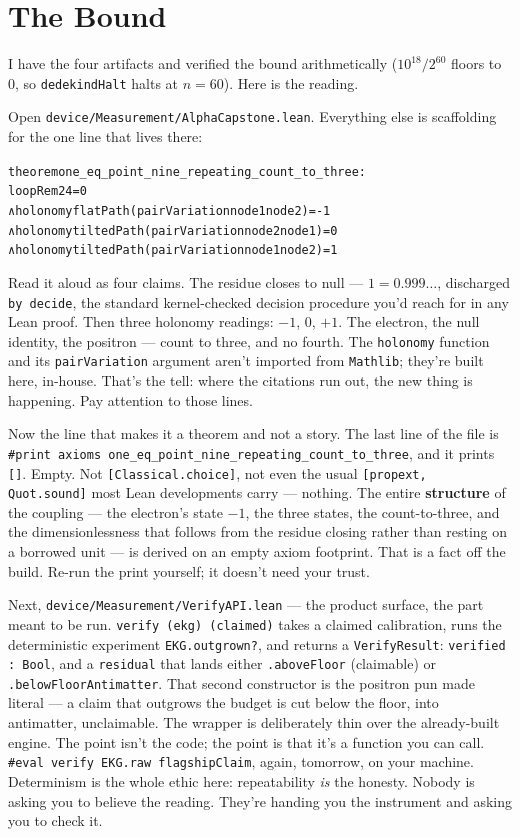 \chapter{The Bound}

I have the four artifacts and verified the bound arithmetically (\(10^{18}/2^{60}\) floors to \(0\), so
\texttt{dedekindHalt} halts at \(n = 60\)). Here is the reading.

Open \texttt{device/Measurement/AlphaCapstone.lean}. Everything else is scaffolding for the one line that lives
there:

\begin{alltt}
theorem one_eq_point_nine_repeating_count_to_three :
    loopRem 2 4 = 0
    ∧ holonomy flatPath   (pairVariation node1 node2) = -1
    ∧ holonomy tiltedPath (pairVariation node2 node1) =  0
    ∧ holonomy tiltedPath (pairVariation node1 node2) =  1
\end{alltt}

Read it aloud as four claims. The residue closes to null --- \(1 = 0.999\ldots\), discharged \texttt{by decide},
the standard kernel-checked decision procedure you'd reach for in any Lean proof. Then three holonomy readings:
\(-1\), \(0\), \(+1\). The electron, the null identity, the positron --- count to three, and no fourth. The
\texttt{holonomy} function and its \texttt{pairVariation} argument aren't imported from \texttt{Mathlib}; they're
built here, in-house. That's the tell: where the citations run out, the new thing is happening. Pay attention to
those lines.

Now the line that makes it a theorem and not a story. The last line of the file is
\texttt{\#print axioms one\_eq\_point\_nine\_repeating\_count\_to\_three}, and it prints \texttt{[]}. Empty. Not
\texttt{[Classical.choice]}, not even the usual \texttt{[propext, Quot.sound]} most Lean developments carry ---
nothing. The entire \textbf{structure} of the coupling --- the electron's state \(-1\), the three states, the
count-to-three, and the dimensionlessness that follows from the residue closing rather than resting on a borrowed
unit --- is derived on an empty axiom footprint. That is a fact off the build. Re-run the print yourself; it doesn't
need your trust.

Next, \texttt{device/Measurement/VerifyAPI.lean} --- the product surface, the part meant to be run.
\texttt{verify (ekg) (claimed)} takes a claimed calibration, runs the deterministic experiment
\texttt{EKG.outgrown?}, and returns a \texttt{VerifyResult}: \texttt{verified : Bool}, and a \texttt{residual} that
lands either \texttt{.aboveFloor} (claimable) or \texttt{.belowFloorAntimatter}. That second constructor is the
positron pun made literal --- a claim that outgrows the budget is cut below the floor, into antimatter, unclaimable.
The wrapper is deliberately thin over the already-built engine. The point isn't the code; the point is that it's a
function you can call. \texttt{\#eval verify EKG.raw flagshipClaim}, again, tomorrow, on your machine. Determinism is
the whole ethic here: repeatability \emph{is} the honesty. Nobody is asking you to believe the reading. They're
handing you the instrument and asking you to check it.

